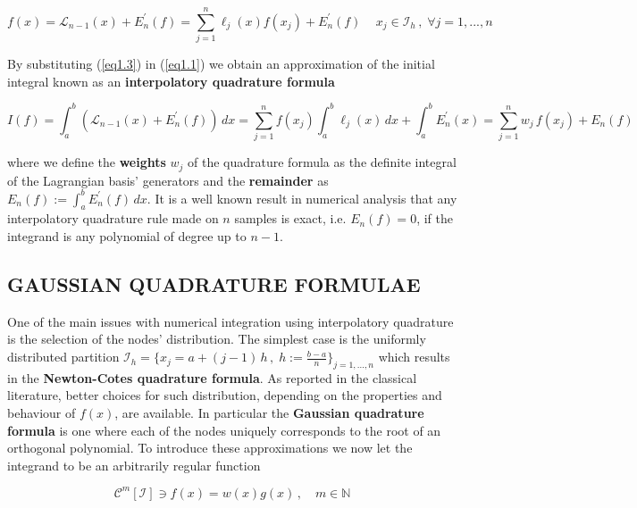 \documentclass[a4paper, twosided]{book}
\begin{document}
\begin{equation}\label{eq1.3}
    f(x) = \mathcal{L}_{n-1}(x) + E^{'}_n(f) = \sum_{j=1}^{n}\ell_j(x)f(x_j) + E^{'}_n(f)\,\quad x_j\in\mathcal{I}_h\,,\;\forall j=1,...,n
\end{equation}

\color{black}

\noindent
By substituting (\ref{eq1.3}) in (\ref{eq1.1}) we obtain an approximation of the initial integral known as an \color{poliDarkBlue} \textbf{interpolatory quadrature formula} \color{black}

\begin{equation}\label{eq1.4}
    I(f) = \int_a^b (\mathcal{L}_{n-1}(x) + E^{'}_n(f))\,dx = \sum_{j=1}^{n}f(x_j)\int_a^b \ell_j(x)\,dx + \int_a^b E^{'}_n(x) = \sum_{j=1}^{n}w_j\,f(x_j) + E_n(f)
\end{equation}

\noindent
where we define the \color{poliDarkBlue} \textbf{weights} \color{black} $w_j$ of the quadrature formula as the definite integral of the Lagrangian basis' generators and the \color{poliDarkBlue} \textbf{remainder} \color{black} as $E_n(f):=\int_a^b E^{'}_n(f)\,dx$. It is a well known result in numerical analysis that any interpolatory quadrature rule made on $n$ samples is exact, i.e. $E_n(f)=0$, if the integrand is any polynomial of degree up to $n-1$.

\subsection[Gaussian quadrature formulae]{\changefont GAUSSIAN QUADRATURE FORMULAE}\label{SubSec1.2.2}

One of the main issues with numerical integration using interpolatory quadrature is the selection of the nodes' distribution. The simplest case is the uniformly distributed partition 
$\mathcal{I}_h =\big\{x_j = a + (j-1)\,h\,,\;h:=\frac{b-a}{n}\big\}_{j=1,...,n}$ which results in the \color{poliDarkBlue} \textbf{Newton-Cotes quadrature formula}\color{black}. As reported in the classical literature, better choices for such distribution, depending on the properties and behaviour of $f(x)$, are available. In particular the \color{poliDarkBlue} \textbf{Gaussian quadrature formula} \color{black} is one where each of the nodes uniquely corresponds to the root of an orthogonal polynomial. To introduce these approximations we now let the integrand to be an arbitrarily regular function

\begin{equation}\label{eq1.5}
    \mathcal{C}^m[\mathcal{I}]\ni f(x) = w(x)g(x)\,,\quad m\in\mathbb{N}
\end{equation}
\end{document}
